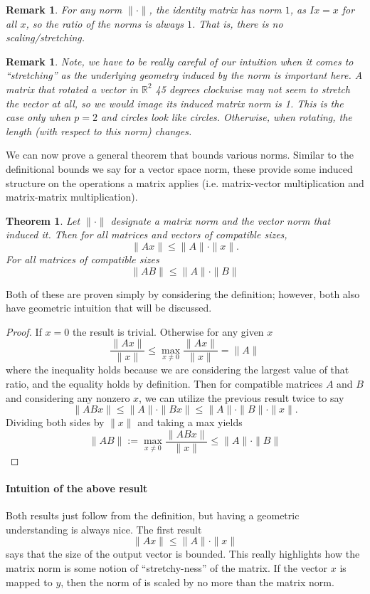 \documentclass[11pt]{article}
\newcommand{\R}{\mathbb{R}}
\newtheorem{theorem}{Theorem}[section]
\newtheorem{remark}[section]{Remark}
\begin{document}
\begin{remark}
    For any norm $\|\cdot\|$, the identity matrix has norm $1$, as $Ix = x$ for all $x$, so the ratio of the norms is always $1$. That is, there is no scaling/stretching. 
\end{remark}

\begin{remark}
    Note, we have to be really careful of our intuition when it comes to ``stretching'' as the underlying geometry induced by the norm is important here. A matrix that rotated a vector in $\R^2$ 45 degrees clockwise may not seem to stretch the vector at all, so we would image its induced matrix norm is 1. This is the case only when $p = 2$ and circles look like circles. Otherwise, when rotating, the length (with respect to this norm) changes. 
\end{remark}

We can now prove a general theorem that bounds various norms. Similar to the definitional bounds we say for a vector space norm, these provide some induced structure on the operations a matrix applies (i.e. matrix-vector multiplication and matrix-matrix multiplication). 
\begin{theorem}
    Let $\|\cdot\|$ designate a matrix norm and the vector norm that induced it. Then for all matrices and vectors of compatible sizes,
    $$\|Ax\|\leq \|A\|\cdot\|x\|.$$
    For all matrices of compatible sizes $$\|AB\| \leq \|A\|\cdot\|B\|$$
\end{theorem}
Both of these are proven simply by considering the definition; however, both also have geometric intuition that will be discussed.
\begin{proof}
    If $x = 0$ the result is trivial. Otherwise for any given $x$  $$\frac{\|Ax\|}{\|x\|} \leq \max_{x \ne 0}\frac{\|Ax\|}{\|x\|} = \|A\|$$
    where the inequality holds because we are considering the largest value of that ratio, and the equality holds by definition. 
    Then for compatible matrices $A$ and $B$ and considering any nonzero $x$, we can utilize the previous result twice to say
    $$\|ABx\| \leq \|A\|\cdot\|Bx\|\leq \|A\|\cdot\|B\| \cdot \|x\|.$$
    Dividing both sides by $\|x\|$ and taking a max yields $$\|AB\| := \max_{x \ne 0}\frac{\|ABx\|}{\|x\|} \leq \|A\|\cdot\|B\|$$
\end{proof}
\paragraph{Intuition of the above result} Both results just follow from the definition, but having a geometric understanding is always nice. The first result $$\|Ax\| \leq \|A\|\cdot\|x\|$$ says that the size of the output vector is bounded. This really highlights how the matrix norm is some notion of ``stretchy-ness'' of the matrix. If the vector $x$ is mapped to $y$, then the norm of is scaled by no more than the matrix norm.
\end{document}
